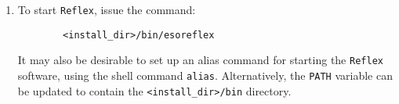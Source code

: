 \begin{enumerate}

  \item To start {\tt Reflex}, issue the command:
        {\small
        \begin{verbatim}
        <install_dir>/bin/esoreflex
        \end{verbatim}
        }
        It may also be desirable to set up an alias command for starting the 
        {\tt Reflex} software, using the shell command {\tt alias}. 
        Alternatively, the {\tt PATH} variable can be updated to contain the
        {\tt \verb|<|install\_dir\verb|>|/bin} directory.
\end{enumerate}

